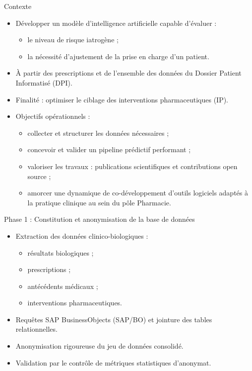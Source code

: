 \documentclass{beamer}
\begin{document}
\begin{frame}{Contexte}
  \begin{itemize}
    \item Développer un modèle d'intelligence artificielle capable d'évaluer :
      \begin{itemize}
        \item le niveau de risque iatrogène ;
        \item la nécessité d'ajustement de la prise en charge d'un patient.
      \end{itemize}
    \item À partir des prescriptions et de l'ensemble des données du Dossier Patient Informatisé (DPI).
    \item Finalité : optimiser le ciblage des interventions pharmaceutiques (IP).
    \item Objectifs opérationnels :
      \begin{itemize}
        \item collecter et structurer les données nécessaires ;
        \item concevoir et valider un pipeline prédictif performant ;
        \item valoriser les travaux : publications scientifiques et contributions open source ;
        \item amorcer une dynamique de co-développement d'outils logiciels adaptés à la pratique clinique au sein du pôle Pharmacie.
      \end{itemize}
  \end{itemize}
\end{frame}

\begin{frame}{Phase 1 : Constitution et anonymisation de la base de données}
  \begin{itemize}
    \item Extraction des données clinico-biologiques :
      \begin{itemize}
        \item résultats biologiques ;
        \item prescriptions ;
        \item antécédents médicaux ;
        \item interventions pharmaceutiques.
      \end{itemize}
    \item Requêtes SAP BusinessObjects (SAP/BO) et jointure des tables relationnelles.
    \item Anonymisation rigoureuse du jeu de données consolidé.
    \item Validation par le contrôle de métriques statistiques d'anonymat.
  \end{itemize}
\end{frame}
\end{document}
